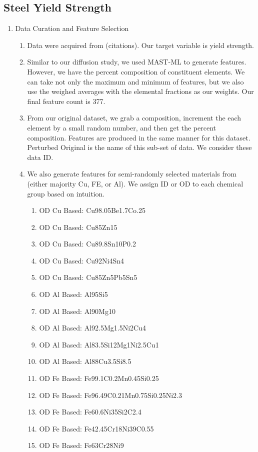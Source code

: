 \subsection{Steel Yield Strength}

\begin{enumerate}
    \item Data Curation and Feature Selection

    \begin{enumerate}
        \item Data were acquired from (citations). Our target variable is yield strength.
        \item Similar to our diffusion study, we used MAST-ML to generate features. However, we have the percent composition of constituent elements. We can take not only the maximum and minimum of features, but we also use the weighed averages with the elemental fractions as our weights. Our final feature count is 377.

        \item From our original dataset, we grab a composition, increment the each element by a small random number, and then get the percent composition. Features are produced in the same manner for this dataset. Perturbed Original is the name of this sub-set of data. We consider these data ID.

        \item We also generate features for semi-randomly selected materials from \cite{nickel_institute} (either majority Cu, FE, or Al).  We assign ID or OD to each chemical group based on intuition.
        
        \begin{enumerate}
            \item OD Cu Based: Cu98.05Be1.7Co.25
            \item OD Cu Based: Cu85Zn15
            \item OD Cu Based: Cu89.8Sn10P0.2
            \item OD Cu Based: Cu92Ni4Sn4
            \item OD Cu Based: Cu85Zn5Pb5Sn5
            \item OD Al Based: Al95Si5
            \item OD Al Based: Al90Mg10
            \item OD Al Based: Al92.5Mg1.5Ni2Cu4
            \item OD Al Based: Al83.5Si12Mg1Ni2.5Cu1
            \item OD Al Based: Al88Cu3.5Si8.5
            \item OD Fe Based: Fe99.1C0.2Mn0.45Si0.25
            \item OD Fe Based: Fe96.49C0.21Mn0.75Si0.25Ni2.3
            \item OD Fe Based: Fe60.6Ni35Si2C2.4
            \item OD Fe Based: Fe42.45Cr18Ni39C0.55
            \item OD Fe Based: Fe63Cr28Ni9
        \end{enumerate}


\end{enumerate}
\end{enumerate}
